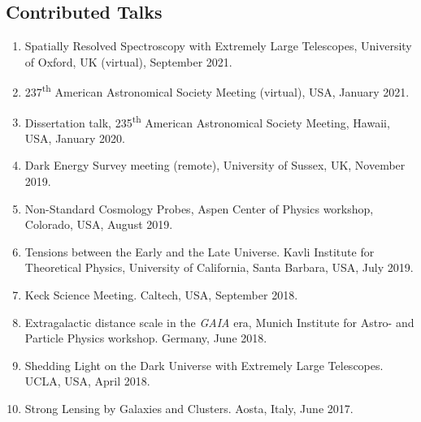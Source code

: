 \documentclass[margin, line]{res}
\begin{document}
\begin{resume}
\section{\sc Contributed Talks}
\begin{enumerate}
	\item Spatially Resolved Spectroscopy with Extremely Large Telescopes, University of Oxford, UK (virtual), September 2021.
	\item 237\textsuperscript{th} American Astronomical Society Meeting (virtual), USA, January 2021.
	\item Dissertation talk, 235\textsuperscript{th} American Astronomical Society Meeting, Hawaii, USA, January 2020.
	\item Dark Energy Survey meeting (remote), University of Sussex, UK, November 2019.
	\item Non-Standard Cosmology Probes, Aspen Center of Physics workshop, Colorado, USA, August 2019.
	\item Tensions between the Early and the Late Universe. Kavli Institute for Theoretical Physics, University of California, Santa Barbara, USA, July 2019.
	\item Keck Science Meeting. Caltech, USA, September 2018.
	\item Extragalactic distance scale in the \textit{GAIA} era, Munich Institute for Astro- and Particle Physics workshop. Germany, June 2018.
	\item Shedding Light on the Dark Universe with Extremely Large Telescopes. UCLA, USA, April 2018.
	\item Strong Lensing by Galaxies and Clusters. Aosta, Italy, June 2017.
\end{enumerate}


\end{resume}
\end{document}
